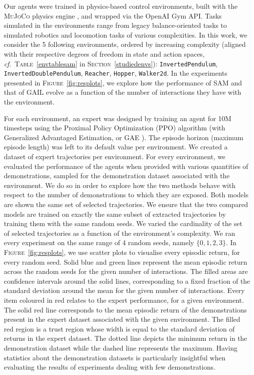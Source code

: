 Our agents were trained in physics-based control environments,
built with the \textsc{MuJoCo} physics engine \cite{Todorov2012-gc},
and wrapped via the OpenAI Gym
\cite{Brockman2016-un} API.
Tasks simulated in the environments range from legacy balance-oriented tasks to
simulated robotics and locomotion tasks of various complexities.
In this work, we consider the 5 following environments,
ordered by increasing complexity (aligned with their respective degrees of freedom in state and action spaces,
\textit{cf.}~\textsc{Table}~\ref{envtablesam}
in \textsc{Section}~\ref{studiedenvs}):
\texttt{InvertedPendulum},
\texttt{InvertedDoublePendulum},
\texttt{Reacher},
\texttt{Hopper},
\texttt{Walker2d}.
In the experiments presented in \textsc{Figure}~\ref{fig:resplots},
we explore how the performance of SAM
and that of GAIL evolve as a function of the number of interactions
they have with the environment.

For each environment, an expert was designed by training an agent for 10M
timesteps using the Proximal Policy Optimization (PPO) algorithm
\cite{Schulman2017-ou} (with Generalized Advantaged Estimation, or GAE \cite{Schulman2016-ym}).
The episode horizon (maximum episode length) was left to its default value per
environment.
We created a dataset of expert trajectories per environment.
For every environment,
we evaluated the performance of the agents
when provided with various quantities of demonstrations,
sampled for the demonstration dataset associated with the environment.
We do so in order to explore how the two methods behave
with respect to the number of demonstrations to which they are exposed.
Both models are shown the same set of selected trajectories.
We ensure that the two
compared models are trained on exactly the same subset of extracted
trajectories by training them with the same random seeds.
We varied the cardinality of the set of selected trajectories
as a function of the environment's complexity.
We ran every experiment on the same range of 4 random seeds, namely
$\{0, 1, 2, 3\}$.
In \textsc{Figure}~\ref{fig:resplots}, we use scatter plots to visualise every
episodic return, for every random seed.
Solid blue and green lines represent the mean episodic return across the
random seeds for the given number of interactions.
The filled areas are confidence intervals around the solid lines,
corresponding to a fixed fraction of the standard deviation around the mean
for the given number of interactions.
Every item coloured in red relates to the expert performance,
for a given environment.
The solid red line corresponds to the mean episodic return of the
demonstrations present in the expert dataset associated with the given
environment.
The filled red region is a trust region whose width is equal to the
standard deviation of returns in the expert dataset.
The dotted line depicts the minimum return in the demonstration dataset while the
dashed line represents the maximum.
Having statistics about the demonstration datasets is particularly insightful
when evaluating the results of experiments dealing with few demonstrations.

